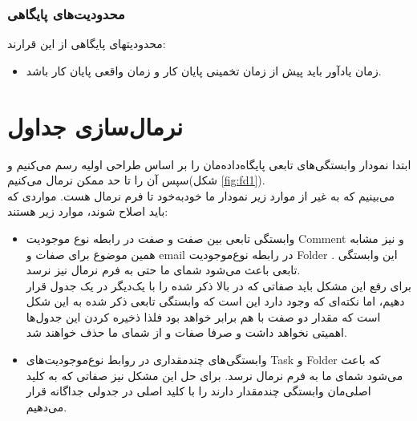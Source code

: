 \documentclass{article}
\begin{document}
\subsubsection*{محدودیت‌های پایگاهی}
محدودیتهای پایگاهی از این قرارند:
\begin{itemize}
\item
زمان یادآور باید پیش از زمان تخمینی پایان کار و زمان واقعی پایان کار باشد. 
\end{itemize}
\section*{نرمال‌سازی جداول}

ابتدا نمودار وابستگی‌های تابعی پایگاه‌داده‌مان را بر اساس طراحی اولیه رسم می‌کنیم و سپس آن را تا حد ممکن نرمال می‌کنیم(شکل \ref{fig:fd1}).
\\
می‌بینیم که به غیر از موارد زیر نمودار ما خود‌به‌خود تا فرم نرمال  هست. مواردی که باید اصلاح شوند، موارد زیر هستند:
\\
\begin{itemize}

\item وابستگی تابعی بین صفت
و صفت
در رابطه نوع موجودیت Comment و نیز مشابه همین موضوع برای صفات
و email در رابطه نوع‌موجودیت Folder . این وابستگی تابعی باعث می‌شود شمای ما حتی به فرم نرمال  نیز نرسد.
\\
برای رفع این مشکل باید صفاتی که در بالا ذکر شده را با یک‌دیگر در یک جدول قرار دهیم، اما نکته‌ای که وجود دارد این است که وابستگی تابعی ذکر شده به این شکل است که مقدار دو صفت با هم برابر خواهد بود فلذا ذخیره کردن این جدول‌ها اهمیتی نخواهد داشت و صرفا صفات
و
از شمای ما حذف خواهند شد.

\item وابستگی‌های چندمقداری در روابط نوع‌موجودیت‌های Task و Folder که باعث می‌شود شمای ما به فرم نرمال  نرسد. برای حل این مشکل نیز صفاتی که به کلید اصلی‌مان وابستگی چندمقدار دارند را با کلید اصلی در جدولی جداگانه قرار می‌دهیم.

\end{itemize}
\end{document}
